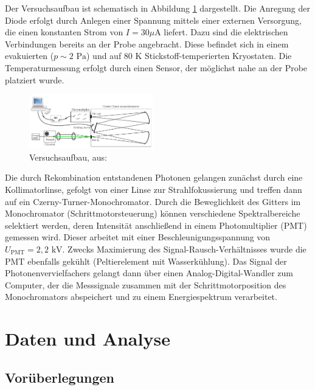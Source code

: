 \documentclass[aps,twocolumn,secnumarabic,nobalancelastpage,amsmath,amssymb,
nofootinbib,superscriptaddress]{revtex4-1}
\begin{document}
\noindent Der Versuchsaufbau ist schematisch in Abbildung \ref{fig:versuch} dargestellt. Die Anregung der Diode erfolgt durch Anlegen einer
Spannung mittels einer externen Versorgung, die einen konstanten Strom von $I=30\text{$\mu$A}$ liefert. Dazu sind die elektrischen Verbindungen bereits an der Probe angebracht.
Diese befindet sich in einem evakuierten ($p\sim 2\text{ Pa}$) und auf $80\text{ K}$ Stickstoff-temperierten Kryostaten. Die Temperaturmessung
erfolgt durch einen Sensor, der möglichst nahe an der Probe platziert wurde.

\begin{figure}[h]
  \centering
  \includegraphics[width=0.48\textwidth]{img/versuchsanleitung.jpg}
  \caption{Versuchsaufbau, aus: \cite{anleitung}}
  \label{fig:versuch}
\end{figure}

\noindent Die durch Rekombination entstandenen Photonen gelangen zunächst durch eine Kollimatorlinse, gefolgt von einer Linse zur
Strahlfokussierung und treffen dann auf ein Czerny-Turner-Monochromator. Durch die Beweglichkeit des Gitters im
Monochromator (Schrittmotorsteuerung) können verschiedene Spektralbereiche selektiert werden, deren Intensität anschließend in einem Photomultiplier (PMT)
gemessen wird. Dieser arbeitet mit einer Beschleunigungsspannung von $U_\text{PMT}=2,2\text{ kV}$. Zwecks Maximierung des
Signal-Rausch-Verhältnisses wurde die PMT ebenfalls gekühlt (Peltierelement mit Wasserkühlung). Das Signal der Photonenvervielfachers
gelangt dann über einen Analog-Digital-Wandler zum Computer, der die Messsignale zusammen mit der Schrittmotorposition des Monochromators
abspeichert und zu einem Energiespektrum verarbeitet.



\section{Daten und Analyse}
\subsection{Vorüberlegungen}
\end{document}

